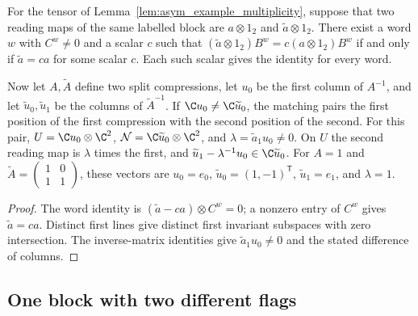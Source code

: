 \begin{lemma}
    \label{lem:asym_example_multiplicity_matching}
    \leanok
    For the tensor of Lemma~\ref{lem:asym_example_multiplicity}, suppose that
    two reading maps of the same labelled block are $a\otimes1_2$ and
    $\widetilde a\otimes1_2$. There exist a word $w$ with $C^w\neq0$ and a
    scalar $c$ such that
    $(\widetilde a\otimes1_2)B^w=c(a\otimes1_2)B^w$ if and only if
    $\widetilde a=ca$ for some scalar $c$. Each such scalar gives the identity
    for every word.

    Now let $A,\widetilde A$ define two split compressions, let $u_0$ be the
    first column of $A^{-1}$, and let $\widetilde u_0,\widetilde u_1$ be the
    columns of $\widetilde A^{-1}$. If $\C u_0\neq\C\widetilde u_0$, the
    matching pairs the first position of the first compression with the
    second position of the second. For this pair,
    $U=\C u_0\otimes\C^2$, $\mathcal N=\C\widetilde u_0\otimes\C^2$, and
    $\lambda=\widetilde a_1u_0\neq0$. On $U$ the second reading map is
    $\lambda$ times the first, and
    $\widetilde u_1-\lambda^{-1}u_0\in\C\widetilde u_0$.
    For $A=1$ and
    $\widetilde A=\left(\begin{smallmatrix}1&0\\1&1\end{smallmatrix}\right)$,
    these vectors are $u_0=e_0$, $\widetilde u_0=(1,-1)^{\mathsf T}$,
    $\widetilde u_1=e_1$, and $\lambda=1$.
\end{lemma}

\begin{proof}
    \leanok
    The word identity is
    $(\widetilde a-ca)\otimes C^w=0$; a nonzero entry of $C^w$ gives
    $\widetilde a=ca$. Distinct first lines give distinct first invariant
    subspaces with zero intersection. The inverse-matrix identities give
    $\widetilde a_1u_0\neq0$ and the stated difference of columns.
\end{proof}

\subsection{One block with two different flags}

